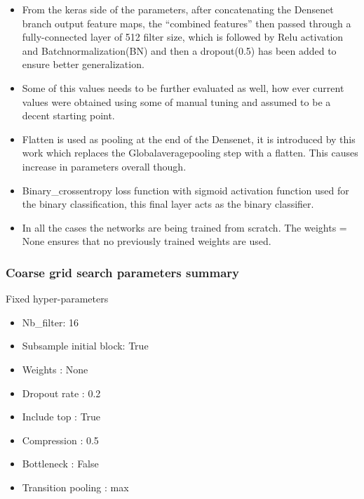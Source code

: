 \begin{itemize}
 \item From the keras side of the parameters, after concatenating the Densenet branch output feature maps, the “combined features” then passed through a fully-connected  
 layer of 512 filter size, which is followed by Relu activation and Batchnormalization(BN)  and then a dropout(0.5) has been added to ensure better generalization. 
 \item Some of this values needs to be further evaluated as well, how ever current values were obtained using some of manual tuning and assumed to be a decent starting point.
 \item Flatten is used as pooling at the end of the Densenet, it is introduced by this work which replaces the Globalaveragepooling step with a flatten. This causes increase 
 in parameters overall though.
 \item Binary\_crossentropy loss function with sigmoid activation function used for the binary classification, this final layer acts as the binary classifier.
 \item In all the cases the networks are being trained from scratch. The weights = None ensures that no previously trained weights are used.
\end{itemize}

\subsubsection{Coarse grid search parameters summary}
\begin{flushleft} {Fixed hyper-parameters}
\begin{itemize}
 \item Nb\_filter: 16
 \item Subsample initial block: True
 \item Weights : None
 \item Dropout rate : 0.2
 \item Include top : True
 \item Compression : 0.5
 \item Bottleneck : False
 \item Transition pooling : max
\end{itemize}
\end{flushleft}

